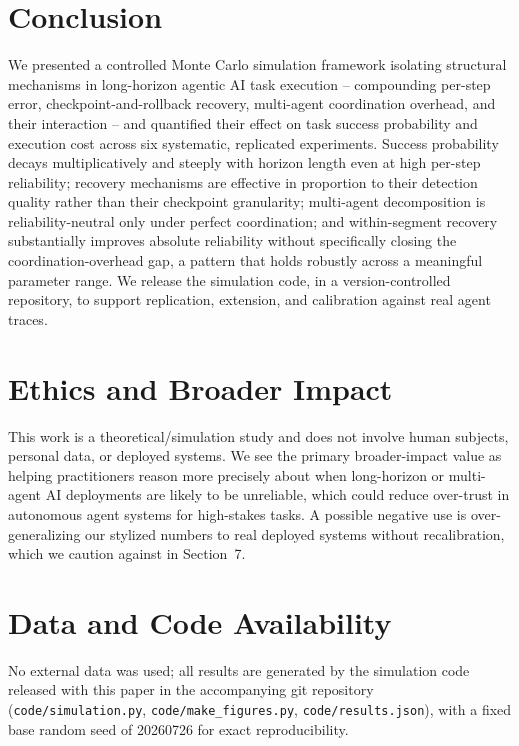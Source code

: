 \documentclass[11pt]{article}
\begin{document}
\section{Conclusion}
We presented a controlled Monte Carlo simulation framework isolating structural mechanisms in long-horizon agentic AI task execution -- compounding per-step error, checkpoint-and-rollback recovery, multi-agent coordination overhead, and their interaction -- and quantified their effect on task success probability and execution cost across six systematic, replicated experiments. Success probability decays multiplicatively and steeply with horizon length even at high per-step reliability; recovery mechanisms are effective in proportion to their detection quality rather than their checkpoint granularity; multi-agent decomposition is reliability-neutral only under perfect coordination; and within-segment recovery substantially improves absolute reliability without specifically closing the coordination-overhead gap, a pattern that holds robustly across a meaningful parameter range. We release the simulation code, in a version-controlled repository, to support replication, extension, and calibration against real agent traces.

\section{Ethics and Broader Impact}
This work is a theoretical/simulation study and does not involve human subjects, personal data, or deployed systems. We see the primary broader-impact value as helping practitioners reason more precisely about when long-horizon or multi-agent AI deployments are likely to be unreliable, which could reduce over-trust in autonomous agent systems for high-stakes tasks. A possible negative use is over-generalizing our stylized numbers to real deployed systems without recalibration, which we caution against in Section~7.

\section{Data and Code Availability}
No external data was used; all results are generated by the simulation code released with this paper in the accompanying git repository (\texttt{code/simulation.py}, \texttt{code/make\_figures.py}, \texttt{code/results.json}), with a fixed base random seed of 20260726 for exact reproducibility.
\end{document}

